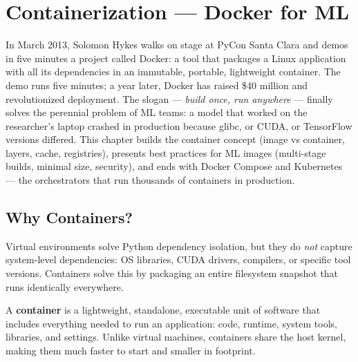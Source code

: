 \chapter{Containerization --- Docker for ML}
\label{ch:docker}

In March 2013, Solomon Hykes walks on stage at PyCon Santa Clara and demos in five minutes a project called Docker: a tool that packages a Linux application with all its dependencies in an immutable, portable, lightweight container. The demo runs five minutes; a year later, Docker has raised \$40 million and revolutionized deployment. The slogan --- \emph{build once, run anywhere} --- finally solves the perennial problem of ML teams: a model that worked on the researcher's laptop crashed in production because glibc, or CUDA, or TensorFlow versions differed. This chapter builds the container concept (image vs container, layers, cache, registries), presents best practices for ML images (multi-stage builds, minimal size, security), and ends with Docker Compose and Kubernetes --- the orchestrators that run thousands of containers in production.

\section{Why Containers?}
\label{sec:why-containers}

Virtual environments solve Python dependency isolation, but they do
\emph{not} capture system-level dependencies: OS libraries, CUDA
drivers, compilers, or specific tool versions. Containers solve this
by packaging an entire filesystem snapshot that runs identically
everywhere.

\begin{definition}[Container]
A \textbf{container} is a lightweight, standalone,
executable unit of software that includes everything needed to run an
application: code, runtime, system tools, libraries, and settings.
Unlike virtual machines, containers share the host kernel, making them
much faster to start and smaller in footprint.
\end{definition}

